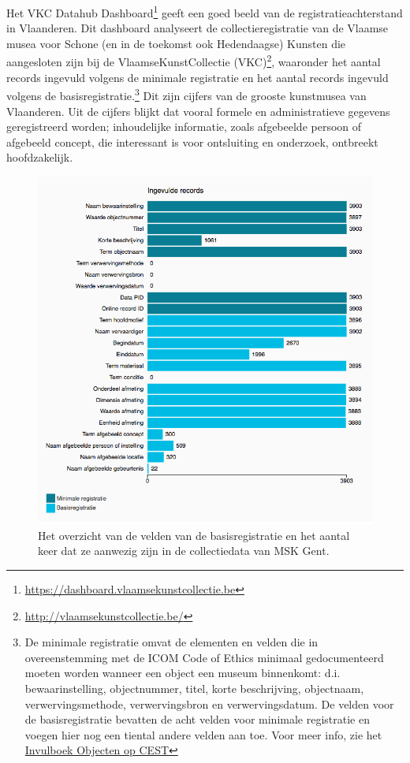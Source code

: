 Het VKC Datahub Dashboard\footnote{\url{https://dashboard.vlaamsekunstcollectie.be}} geeft een goed beeld van de registratieachterstand in Vlaanderen. Dit dashboard analyseert de collectieregistratie van de Vlaamse musea voor Schone (en in de toekomst ook Hedendaagse) Kunsten die aangesloten zijn bij de VlaamseKunstCollectie (VKC)\footnote{\url{http://vlaamsekunstcollectie.be/}}, waaronder het aantal records ingevuld volgens de minimale registratie en het aantal records ingevuld volgens de basisregistratie.\footnote{De minimale registratie omvat de elementen en velden die in overeenstemming met de ICOM Code of Ethics minimaal gedocumenteerd moeten worden wanneer een object een museum binnenkomt: d.i. bewaarinstelling, objectnummer, titel, korte beschrijving, objectnaam, verwervingsmethode, verwervingsbron en verwervingsdatum. De velden voor de basisregistratie bevatten de acht velden voor minimale registratie en voegen hier nog een tiental andere velden aan toe. Voor meer info, zie het \href{https://www.projectcest.be/wiki/Publicatie:Invulboek_objecten/Profielen/Basisregistratie}{Invulboek Objecten op CEST}} Dit zijn cijfers van de grooste kunstmusea van Vlaanderen. Uit de cijfers blijkt dat vooral formele en administratieve gegevens geregistreerd worden; inhoudelijke informatie, zoals afgebeelde persoon of afgebeeld concept, die interessant is voor ontsluiting en onderzoek, ontbreekt hoofdzakelijk.

\begin{figure}[h]
	\caption{Het overzicht van de velden van de basisregistratie en het aantal keer dat ze aanwezig zijn in de collectiedata van MSK Gent.}
	\centering
	\includegraphics[width=\linewidth]{../voorstel/pictures/VKC_velden_basis.png}
\end{figure}

